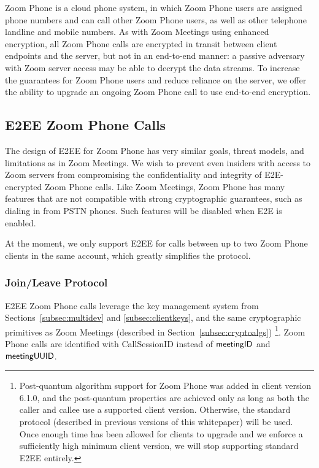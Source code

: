 Zoom Phone is a cloud phone system, in which Zoom Phone users are assigned phone numbers and can
call other Zoom Phone users, as well as other telephone landline and mobile numbers. As with Zoom
Meetings using enhanced encryption, all Zoom Phone calls are encrypted in transit between client
endpoints and the server, but not in an end-to-end manner: a passive adversary with Zoom server
access may be able to decrypt the data streams. To increase the guarantees for Zoom Phone users and
reduce reliance on the server, we offer the ability to upgrade an ongoing Zoom Phone call to use
end-to-end encryption.

\subsection{E2EE Zoom Phone Calls}\label{subsec:phone}

The design of E2EE for Zoom Phone has very similar goals, threat models, and limitations as in Zoom
Meetings. We wish to prevent even insiders with access to Zoom servers from compromising the
confidentiality and integrity of E2E-encrypted Zoom Phone calls. Like Zoom Meetings, Zoom Phone has
many features that are not compatible with strong cryptographic guarantees, such as dialing in from
PSTN phones. Such features will be disabled when E2E is enabled.

At the moment, we only support E2EE for calls between up to two Zoom Phone clients in the same
account, which greatly simplifies the protocol.

\subsubsection{Join/Leave Protocol}

E2EE Zoom Phone calls leverage the key management system from Sections~\ref{subsec:multidev} and
\ref{subsec:clientkeys}, and the same cryptographic primitives as Zoom Meetings (described in
Section~\ref{subsec:cryptoalgs})%
\footnote{Post-quantum algorithm support for Zoom Phone was added in client version 6.1.0, and the post-quantum properties are achieved only as long as both the caller and callee use a supported client version. Otherwise, the standard protocol (described in previous versions of this whitepaper) will be used. Once enough time has been allowed for clients to upgrade and we enforce a sufficiently high minimum client version, we will stop supporting standard E2EE entirely.}. Zoom Phone calls are identified with {\sf CallSessionID} instead
of ${\sf meetingID}$ and ${\sf meetingUUID}$.

